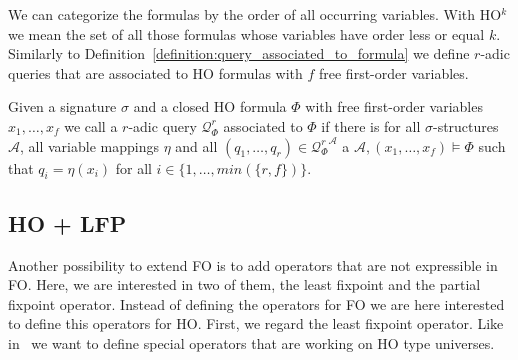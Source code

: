 We can categorize the formulas by the order of all occurring variables. With HO$^k$ we mean 
the set of all those formulas whose variables have order less or equal $k$.
Similarly to Definition~\ref{definition:query_associated_to_formula} we define $r$-adic queries that are associated to HO formulas with $f$ free first-order variables. 

\begin{definition}
\label{definition:query_associated_to_formula_ho}
    Given a signature $\sigma$ and a closed HO
    formula $\Phi$ with free first-order variables $x_1, \dots, x_f$ we call a $r$-adic query $\mathcal{Q}^r_\Phi$ associated to $\Phi$ if there is for all $\sigma$-structures
    $\mathcal{A}$, all variable mappings $\eta$ and all $(q_1, \dots, q_r) \in {\mathcal{Q}^r_\Phi}^\mathcal{A}$ a $\mathcal{A}, (x_1, \dots, x_f) \models
     \Phi$ such that $q_i = \eta(x_i)$ for all $i \in
    \{1, \dots, min(\{r, f\})\}$.
\end{definition}

\subsection{HO + LFP}
\label{subsec:hoPlusLfp}

Another possibility to extend FO is to add operators that are not expressible in FO. Here, we are interested in two
of them, the least fixpoint and the partial fixpoint operator. Instead of defining the operators for FO we are
here interested to define this operators for HO. First, we regard the least fixpoint operator.
Like in~\cite{freireMartins2011descriptive} we want to define special operators that are working on HO type universes.

